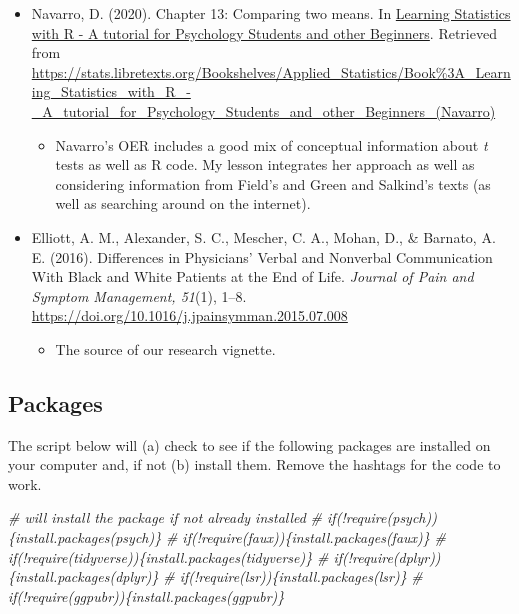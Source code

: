 \documentclass[
  11pt,
]{book}
\newenvironment{Shaded}{\begin{snugshade}}{\end{snugshade}}
\newcommand{\CommentTok}[1]{\textcolor[rgb]{0.56,0.35,0.01}{\textit{#1}}}
\providecommand{\tightlist}{%
  \setlength{\itemsep}{0pt}\setlength{\parskip}{0pt}}
\begin{document}
\begin{itemize}
\tightlist
\item
  Navarro, D. (2020). Chapter 13: Comparing two means. In \href{https://learningstatisticswithr.com/}{Learning Statistics with R - A tutorial for Psychology Students and other Beginners}. Retrieved from \url{https://stats.libretexts.org/Bookshelves/Applied_Statistics/Book\%3A_Learning_Statistics_with_R_-_A_tutorial_for_Psychology_Students_and_other_Beginners_(Navarro)}

  \begin{itemize}
  \tightlist
  \item
    Navarro's OER includes a good mix of conceptual information about \emph{t} tests as well as R code. My lesson integrates her approach as well as considering information from Field's \citeyearpar{field_discovering_2012} and Green and Salkind's \citeyearpar{green_using_2014} texts (as well as searching around on the internet).
  \end{itemize}
\item
  Elliott, A. M., Alexander, S. C., Mescher, C. A., Mohan, D., \& Barnato, A. E. (2016). Differences in Physicians' Verbal and Nonverbal Communication With Black and White Patients at the End of Life. \emph{Journal of Pain and Symptom Management, 51}(1), 1--8. \url{https://doi.org/10.1016/j.jpainsymman.2015.07.008}

  \begin{itemize}
  \tightlist
  \item
    The source of our research vignette.
  \end{itemize}
\end{itemize}

\hypertarget{packages}{%
\subsection{Packages}\label{packages}}

The script below will (a) check to see if the following packages are installed on your computer and, if not (b) install them. Remove the hashtags for the code to work.

\begin{Shaded}
\begin{Highlighting}[]
\CommentTok{\# will install the package if not already installed}
\CommentTok{\# if(!require(psych))\{install.packages(\textquotesingle{}psych\textquotesingle{})\}}
\CommentTok{\# if(!require(faux))\{install.packages(\textquotesingle{}faux\textquotesingle{})\}}
\CommentTok{\# if(!require(tidyverse))\{install.packages(\textquotesingle{}tidyverse\textquotesingle{})\}}
\CommentTok{\# if(!require(dplyr))\{install.packages(\textquotesingle{}dplyr\textquotesingle{})\}}
\CommentTok{\# if(!require(lsr))\{install.packages(\textquotesingle{}lsr\textquotesingle{})\}}
\CommentTok{\# if(!require(ggpubr))\{install.packages(\textquotesingle{}ggpubr\textquotesingle{})\}}
\end{Highlighting}
\end{Shaded}
\end{document}
